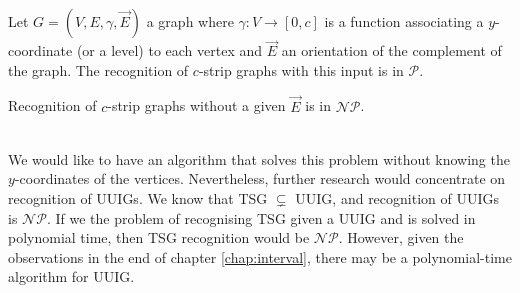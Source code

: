 \begin{theorem}
  Let $G = (V,E,\gamma,\overrightarrow{E})$ a graph where $\gamma: V \to [0,c]$ is a function associating a $y$-coordinate (or a level) to each vertex and $\overrightarrow{E}$ an orientation of the complement of the graph. The recognition of $c$-strip graphs with this input is in $\mathcal{P}$.
\end{theorem}

\begin{obs}
  Recognition of $c$-strip graphs without a given $\overrightarrow{E}$ is in $\mathcal{NP}$.
\end{obs}

\\

We would like to have an algorithm that solves this problem without knowing the $y$-coordinates of the vertices. Nevertheless, further research would concentrate on recognition of UUIGs. We know that TSG $\subsetneq$ UUIG, and recognition of UUIGs is $\mathcal{NP}$. If we the problem of recognising TSG given a UUIG and is solved in polynomial time, then TSG recognition would be $\mathcal{NP}$. However, given the observations in the end of chapter \ref{chap:interval}, there may be a polynomial-time algorithm for UUIG.
